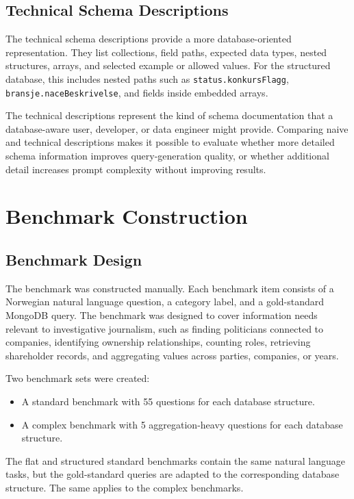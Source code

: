 \subsection{Technical Schema Descriptions}

The technical schema descriptions provide a more database-oriented representation. They list collections, field paths, expected data types, nested structures, arrays, and selected example or allowed values. For the structured database, this includes nested paths such as \texttt{status.konkursFlagg}, \texttt{bransje.naceBeskrivelse}, and fields inside embedded arrays.

The technical descriptions represent the kind of schema documentation that a database-aware user, developer, or data engineer might provide. Comparing naive and technical descriptions makes it possible to evaluate whether more detailed schema information improves query-generation quality, or whether additional detail increases prompt complexity without improving results.

\section{Benchmark Construction}

\subsection{Benchmark Design}

The benchmark was constructed manually. Each benchmark item consists of a Norwegian natural language question, a category label, and a gold-standard MongoDB query. The benchmark was designed to cover information needs relevant to investigative journalism, such as finding politicians connected to companies, identifying ownership relationships, counting roles, retrieving shareholder records, and aggregating values across parties, companies, or years.

Two benchmark sets were created:

\begin{itemize}
    \item A standard benchmark with 55 questions for each database structure.
    \item A complex benchmark with 5 aggregation-heavy questions for each database structure.
\end{itemize}

The flat and structured standard benchmarks contain the same natural language tasks, but the gold-standard queries are adapted to the corresponding database structure. The same applies to the complex benchmarks.

